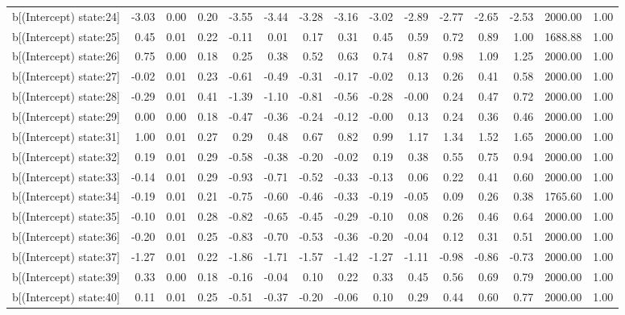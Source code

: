 \begin{table}[ht]
\begin{tabular}{rrrrrrrrrrrrrrr}
  b[(Intercept) state:24] & -3.03 & 0.00 & 0.20 & -3.55 & -3.44 & -3.28 & -3.16 & -3.02 & -2.89 & -2.77 & -2.65 & -2.53 & 2000.00 & 1.00 \\ 
  b[(Intercept) state:25] & 0.45 & 0.01 & 0.22 & -0.11 & 0.01 & 0.17 & 0.31 & 0.45 & 0.59 & 0.72 & 0.89 & 1.00 & 1688.88 & 1.00 \\ 
  b[(Intercept) state:26] & 0.75 & 0.00 & 0.18 & 0.25 & 0.38 & 0.52 & 0.63 & 0.74 & 0.87 & 0.98 & 1.09 & 1.25 & 2000.00 & 1.00 \\ 
  b[(Intercept) state:27] & -0.02 & 0.01 & 0.23 & -0.61 & -0.49 & -0.31 & -0.17 & -0.02 & 0.13 & 0.26 & 0.41 & 0.58 & 2000.00 & 1.00 \\ 
  b[(Intercept) state:28] & -0.29 & 0.01 & 0.41 & -1.39 & -1.10 & -0.81 & -0.56 & -0.28 & -0.00 & 0.24 & 0.47 & 0.72 & 2000.00 & 1.00 \\ 
  b[(Intercept) state:29] & 0.00 & 0.00 & 0.18 & -0.47 & -0.36 & -0.24 & -0.12 & -0.00 & 0.13 & 0.24 & 0.36 & 0.46 & 2000.00 & 1.00 \\ 
  b[(Intercept) state:31] & 1.00 & 0.01 & 0.27 & 0.29 & 0.48 & 0.67 & 0.82 & 0.99 & 1.17 & 1.34 & 1.52 & 1.65 & 2000.00 & 1.00 \\ 
  b[(Intercept) state:32] & 0.19 & 0.01 & 0.29 & -0.58 & -0.38 & -0.20 & -0.02 & 0.19 & 0.38 & 0.55 & 0.75 & 0.94 & 2000.00 & 1.00 \\ 
  b[(Intercept) state:33] & -0.14 & 0.01 & 0.29 & -0.93 & -0.71 & -0.52 & -0.33 & -0.13 & 0.06 & 0.22 & 0.41 & 0.60 & 2000.00 & 1.00 \\ 
  b[(Intercept) state:34] & -0.19 & 0.01 & 0.21 & -0.75 & -0.60 & -0.46 & -0.33 & -0.19 & -0.05 & 0.09 & 0.26 & 0.38 & 1765.60 & 1.00 \\ 
  b[(Intercept) state:35] & -0.10 & 0.01 & 0.28 & -0.82 & -0.65 & -0.45 & -0.29 & -0.10 & 0.08 & 0.26 & 0.46 & 0.64 & 2000.00 & 1.00 \\ 
  b[(Intercept) state:36] & -0.20 & 0.01 & 0.25 & -0.83 & -0.70 & -0.53 & -0.36 & -0.20 & -0.04 & 0.12 & 0.31 & 0.51 & 2000.00 & 1.00 \\ 
  b[(Intercept) state:37] & -1.27 & 0.01 & 0.22 & -1.86 & -1.71 & -1.57 & -1.42 & -1.27 & -1.11 & -0.98 & -0.86 & -0.73 & 2000.00 & 1.00 \\ 
  b[(Intercept) state:39] & 0.33 & 0.00 & 0.18 & -0.16 & -0.04 & 0.10 & 0.22 & 0.33 & 0.45 & 0.56 & 0.69 & 0.79 & 2000.00 & 1.00 \\ 
  b[(Intercept) state:40] & 0.11 & 0.01 & 0.25 & -0.51 & -0.37 & -0.20 & -0.06 & 0.10 & 0.29 & 0.44 & 0.60 & 0.77 & 2000.00 & 1.00 \\ 

\end{tabular}
\end{table}
